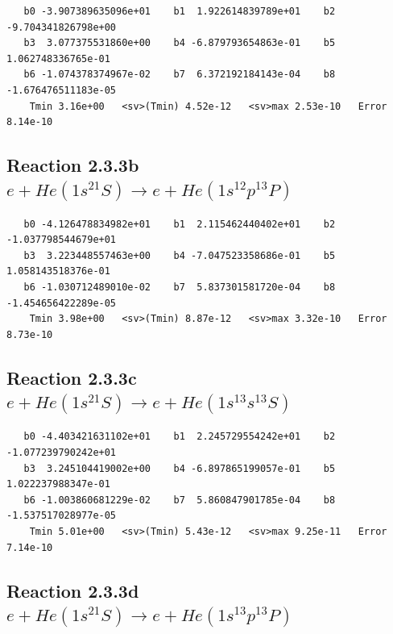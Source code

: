 \documentclass[12pt,dvipdfmx]{article}
\begin{document}
\begin{small}\begin{verbatim}
   b0 -3.907389635096e+01    b1  1.922614839789e+01    b2 -9.704341826798e+00
   b3  3.077375531860e+00    b4 -6.879793654863e-01    b5  1.062748336765e-01
   b6 -1.074378374967e-02    b7  6.372192184143e-04    b8 -1.676476511183e-05
    Tmin 3.16e+00   <sv>(Tmin) 4.52e-12   <sv>max 2.53e-10   Error 8.14e-10
\end{verbatim}\end{small}







\newpage
\subsection{
Reaction 2.3.3b $  e + He(1s^21S) \rightarrow e + He(1s^12p^13P)$}


\begin{small}\begin{verbatim}
   b0 -4.126478834982e+01    b1  2.115462440402e+01    b2 -1.037798544679e+01
   b3  3.223448557463e+00    b4 -7.047523358686e-01    b5  1.058143518376e-01
   b6 -1.030712489010e-02    b7  5.837301581720e-04    b8 -1.454656422289e-05
    Tmin 3.98e+00   <sv>(Tmin) 8.87e-12   <sv>max 3.32e-10   Error 8.73e-10
\end{verbatim}\end{small}

\newpage
\subsection{
Reaction 2.3.3c $  e + He(1s^21S) \rightarrow e + He(1s^13s^13S)$}


\begin{small}\begin{verbatim}
   b0 -4.403421631102e+01    b1  2.245729554242e+01    b2 -1.077239790242e+01
   b3  3.245104419002e+00    b4 -6.897865199057e-01    b5  1.022237988347e-01
   b6 -1.003860681229e-02    b7  5.860847901785e-04    b8 -1.537517028977e-05
    Tmin 5.01e+00   <sv>(Tmin) 5.43e-12   <sv>max 9.25e-11   Error 7.14e-10
\end{verbatim}\end{small}

\newpage
\subsection{
Reaction 2.3.3d $  e + He(1s^21S) \rightarrow e + He(1s^13p^13P)$}
\end{document}
